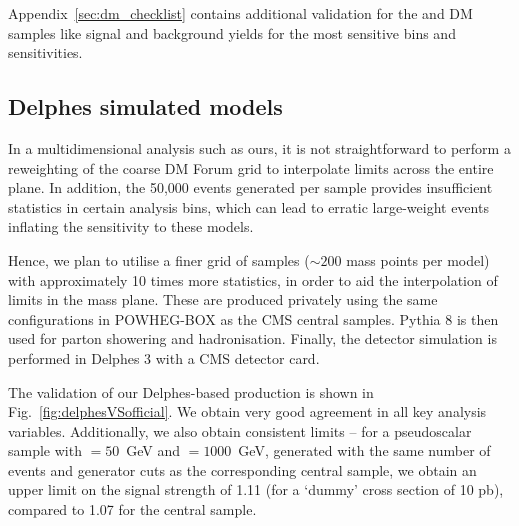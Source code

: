 Appendix~\ref{sec:dm_checklist} contains additional validation for the \DMtt and \DMtt DM samples like signal and background yields for the most sensitive bins and sensitivities.




\subsection{Delphes simulated models}

In a multidimensional analysis such as ours, it is not straightforward to
perform a reweighting of the coarse DM Forum grid to interpolate limits
across the entire plane. In addition, the 50,000 events generated per sample
provides insufficient statistics in certain analysis bins, which can lead to
erratic large-weight events inflating the sensitivity to these models.

Hence, we plan to utilise a finer grid of samples ($\sim200$ mass points per
model) with approximately 10 times more statistics, in order to aid the
interpolation of limits in the mass plane. These are produced privately using the same 
configurations in POWHEG-BOX as the CMS central samples. Pythia 8 is then used
for parton showering and hadronisation. Finally, the detector simulation is 
performed in Delphes 3 with a CMS detector card.

The validation of our Delphes-based production is shown in Fig.~\ref{fig:delphesVSofficial}. We
obtain very good agreement in all key analysis variables. Additionally, we
also obtain consistent limits -- for a pseudoscalar sample with \mchi$=50$~GeV
and \mphi$=1000$~GeV, generated with the same number of events and generator
cuts as the corresponding central sample, we obtain an upper limit on the
signal strength of 1.11 (for a `dummy' cross section of 10 pb), compared to 1.07 
for the central sample.

